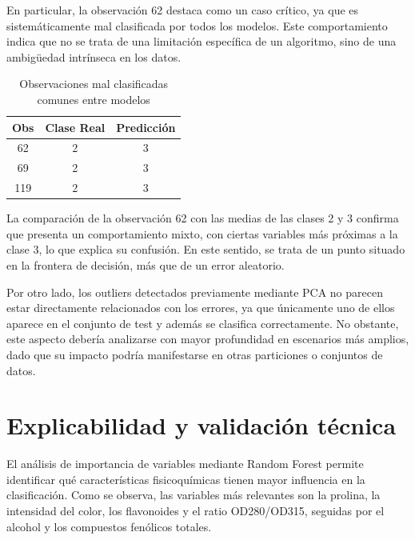 \vspace{0.3cm}

En particular, la observación 62 destaca como un caso crítico, ya que es sistemáticamente mal clasificada por todos los modelos. Este comportamiento indica que no se trata de una limitación específica de un algoritmo, sino de una ambigüedad intrínseca en los datos.

\vspace{0.3cm}

\begin{table}[h]
\centering
\caption{Observaciones mal clasificadas comunes entre modelos}
\begin{tabular}{c c c}
\hline
\textbf{Obs} & \textbf{Clase Real} & \textbf{Predicción} \\
\hline
62 & 2 & 3 \\
69 & 2 & 3 \\
119 & 2 & 3 \\
\hline
\end{tabular}
\label{tab:errores_comunes}
\end{table}

\vspace{0.3cm}

La comparación de la observación 62 con las medias de las clases 2 y 3 confirma que presenta un comportamiento mixto, con ciertas variables más próximas a la clase 3, lo que explica su confusión. En este sentido, se trata de un punto situado en la frontera de decisión, más que de un error aleatorio.

\vspace{0.3cm}

Por otro lado, los outliers detectados previamente mediante PCA no parecen estar directamente relacionados con los errores, ya que únicamente uno de ellos aparece en el conjunto de test y además se clasifica correctamente. No obstante, este aspecto debería analizarse con mayor profundidad en escenarios más amplios, dado que su impacto podría manifestarse en otras particiones o conjuntos de datos.


\section{Explicabilidad y validación técnica}
El análisis de importancia de variables mediante Random Forest permite identificar qué características fisicoquímicas tienen mayor influencia en la clasificación. Como se observa, las variables más relevantes son la prolina, la intensidad del color, los flavonoides y el ratio OD280/OD315, seguidas por el alcohol y los compuestos fenólicos totales.

